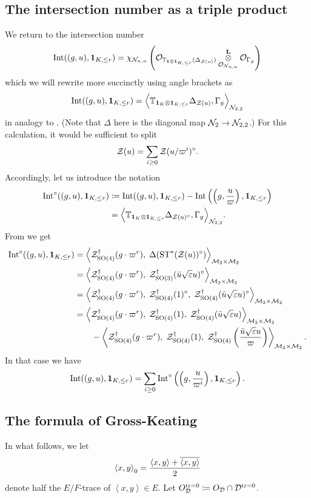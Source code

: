 \subsection{The intersection number as a triple product}
We return to the intersection number
\[ \operatorname{Int}((g,u), \mathbf{1}_{K, \le r}) = \chi_{\mathcal N_{n,n}} \left(
      \mathcal{O}_{\mathbb T_{\mathbf{1} \otimes \mathbf{1}_{K, \le r}}(\Delta_{\mathcal Z(u)})}
      \mathop{\otimes}^{\mathbf{L}}_{\mathcal{O}_{\mathcal N_{n,n}}} \mathcal{O}_{\Gamma_g} \right) \]
which we will rewrite more succinctly using angle brackets as
\[ \operatorname{Int}((g,u), \mathbf{1}_{K, \le r}) = \Big\langle
  \mathbb{T}_{\mathbf{1}_K \otimes \mathbf{1}_{K, \le r}}
  \Delta_{\mathcal Z(u)}, \Gamma_g \Big\rangle_{\mathcal N_{2,2}} \]
in analogy to \cite[\S6.1]{ref:AFLspherical}.
(Note that $\Delta$ here is the diagonal map $\mathcal N_2 \to \mathcal N_{2,2}$.)
For this calculation, it would be sufficient to split
\[ \mathcal Z(u) = \sum_{i \ge 0} \mathcal Z(u/\varpi^i)^\circ. \]
Accordingly, let us introduce the notation
\begin{align*}
  \operatorname{Int}^\circ((g,u), \mathbf{1}_{K, \le r})
  &\coloneqq \operatorname{Int}((g,u), \mathbf{1}_{K, \le r}) - \operatorname{Int}\left( \left( g, \frac{u}{\varpi} \right), \mathbf{1}_{K, \le r} \right) \\
  &= \Big\langle \mathbb{T}_{\mathbf{1}_K \otimes \mathbf{1}_{K, \le r}}
    \Delta_{\mathcal Z(u)^\circ}, \Gamma_g \Big\rangle_{\mathcal N_{2,2}}.
\end{align*}
From  we get
\begin{align*}
  \operatorname{Int}^\circ((g,u), \mathbf{1}_{K, \le r})
  &= \left< \mathcal Z^{\dagger}_{\operatorname{SO}(4)}(g \cdot \varpi^r), \; \Delta(\operatorname{ST}^\ast(\mathcal Z(u))^\circ) \right>_{\mathcal M_2 \times \mathcal M_2} \\
  &= \left< \mathcal Z^{\dagger}_{\operatorname{SO}(4)}(g \cdot \varpi^r), \; \mathcal Z^{\dagger}_{\operatorname{SO}(3)}(\bar u \sqrt{\varepsilon} u)^\circ \right>_{\mathcal M_2 \times \mathcal M_2} \\
  &= \left< \mathcal Z^{\dagger}_{\operatorname{SO}(4)}(g \cdot \varpi^r), \; \mathcal Z^{\dagger}_{\operatorname{SO}(4)}(1)^\circ, \; \mathcal Z^{\dagger}_{\operatorname{SO}(4)}(\bar u \sqrt{\varepsilon} u)^\circ \right>_{\mathcal M_2 \times \mathcal M_2} \\
  &= \left< \mathcal Z^{\dagger}_{\operatorname{SO}(4)}(g \cdot \varpi^r), \; \mathcal Z^{\dagger}_{\operatorname{SO}(4)}(1), \; \mathcal Z^{\dagger}_{\operatorname{SO}(4)}(\bar u \sqrt{\varepsilon} u) \right>_{\mathcal M_2 \times \mathcal M_2} \\
  &\qquad- \left< \mathcal Z^{\dagger}_{\operatorname{SO}(4)}(g \cdot \varpi^r), \; \mathcal Z^{\dagger}_{\operatorname{SO}(4)}(1), \; \mathcal Z^{\dagger}_{\operatorname{SO}(4)}\left( \frac{\bar u \sqrt{\varepsilon} u}{\varpi} \right) \right>_{\mathcal M_2 \times \mathcal M_2}.
\end{align*}
In that case we have
\begin{equation}
  \operatorname{Int}((g,u), \mathbf{1}_{K, \le r})
  = \sum_{i \ge 0} \operatorname{Int}^\circ\left( \left( g, \frac{u}{\varpi^i} \right), \mathbf{1}_{K, \le r} \right).
  \label{eq:int_to_int_circ}
\end{equation}

\subsection{The formula of Gross-Keating}
\label{sec:GK}
In what follows, we let
\[ \left\langle x, y \right\rangle _0
  = \frac{\left\langle x,y \right\rangle + \overline{\left\langle x,y \right\rangle}}{2} \]
denote half the $E/F$-trace of $\left\langle x,y \right\rangle \in E$.
Let $O_\mathcal D^{\operatorname{tr} = 0} \coloneqq O_\mathcal D \cap \mathcal D^{\operatorname{tr} = 0}$.

